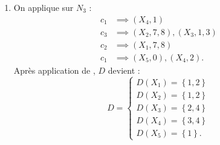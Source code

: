 \begin{td-sol}
\begin{enumerate}
        \item On applique  sur \(N_3\) :
        \begin{equation*}
            \begin{aligned}
                c_1 &\implies (X_4, 1) \\
                c_3 &\implies (X_2, 7, 8), (X_3, 1, 3) \\
                c_2 &\implies (X_1, 7, 8) \\
                c_1 &\implies (X_5, 0), (X_4, 2).
            \end{aligned}
        \end{equation*}
        Après application de , \(D\) devient :
        \begin{equation*}
            D = 
            \begin{cases}
                D(X_1) = \left\{1, 2\right\} \\
                D(X_2) = \left\{1, 2\right\} \\
                D(X_3) = \left\{2, 4\right\} \\
                D(X_4) = \left\{3, 4\right\} \\
                D(X_5) = \left\{1\right\}.
            \end{cases}
        \end{equation*}
    \end{enumerate}
\end{td-sol}



